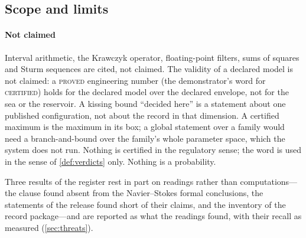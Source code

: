 \documentclass[preprint,11pt,a4paper]{elsarticle}
\theoremstyle{definition}
\newcommand{\verdict}[1]{\textup{\textsc{#1}}}
\newcommand{\CERT}{\verdict{certified}}
\begin{document}
\subsection{Scope and limits}\label{sec:limits}

\paragraph{Not claimed} Interval arithmetic, the Krawczyk operator, floating-point filters, sums of squares and Sturm sequences are cited, not claimed. The validity of a declared model is not claimed: a \textsc{proved} engineering number (the demonstrator's word for \CERT) holds for the declared model over the declared envelope, not for the sea or the reservoir. A kissing bound ``decided here'' is a statement about one published configuration, not about the record in that dimension. A certified maximum is the maximum in its box; a global statement over a family would need a branch-and-bound over the family's whole parameter space, which the system does not run. Nothing is certified in the regulatory sense; the word is used in the sense of \cref{def:verdicts} only. Nothing is a probability.

Three results of the register rest in part on readings rather than computations---the clause found absent from the Navier--Stokes formal conclusions, the statements of the release found short of their claims, and the inventory of the record package---and are reported as what the readings found, with their recall as measured (\cref{sec:threats}).
\end{document}
